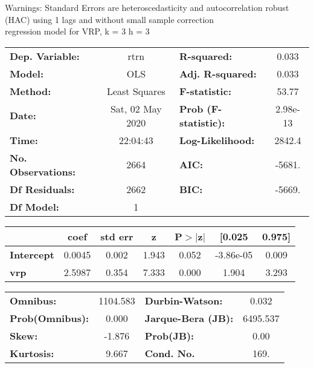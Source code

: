 Warnings: \newline
 [1] Standard Errors are heteroscedasticity and autocorrelation robust (HAC) using 1 lags and without small sample correction\\ 

regression model for VRP, k = 3 h = 3\begin{center}
\begin{tabular}{lclc}
\toprule
\textbf{Dep. Variable:}    &       rtrn       & \textbf{  R-squared:         } &     0.033   \\
\textbf{Model:}            &       OLS        & \textbf{  Adj. R-squared:    } &     0.033   \\
\textbf{Method:}           &  Least Squares   & \textbf{  F-statistic:       } &     53.77   \\
\textbf{Date:}             & Sat, 02 May 2020 & \textbf{  Prob (F-statistic):} &  2.98e-13   \\
\textbf{Time:}             &     22:04:43     & \textbf{  Log-Likelihood:    } &    2842.4   \\
\textbf{No. Observations:} &        2664      & \textbf{  AIC:               } &    -5681.   \\
\textbf{Df Residuals:}     &        2662      & \textbf{  BIC:               } &    -5669.   \\
\textbf{Df Model:}         &           1      & \textbf{                     } &             \\
\bottomrule
\end{tabular}
\begin{tabular}{lcccccc}
                   & \textbf{coef} & \textbf{std err} & \textbf{z} & \textbf{P$> |$z$|$} & \textbf{[0.025} & \textbf{0.975]}  \\
\midrule
\textbf{Intercept} &       0.0045  &        0.002     &     1.943  &         0.052        &    -3.86e-05    &        0.009     \\
\textbf{vrp}       &       2.5987  &        0.354     &     7.333  &         0.000        &        1.904    &        3.293     \\
\bottomrule
\end{tabular}
\begin{tabular}{lclc}
\textbf{Omnibus:}       & 1104.583 & \textbf{  Durbin-Watson:     } &    0.032  \\
\textbf{Prob(Omnibus):} &   0.000  & \textbf{  Jarque-Bera (JB):  } & 6495.537  \\
\textbf{Skew:}          &  -1.876  & \textbf{  Prob(JB):          } &     0.00  \\
\textbf{Kurtosis:}      &   9.667  & \textbf{  Cond. No.          } &     169.  \\
\bottomrule
\end{tabular}
\end{center}

